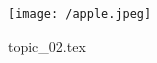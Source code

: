 \documentclass[a4paper,12pt, openany]{book}
\begin{document}
    \maketitle

    \texttt{[image: /apple.jpeg]}

    
    {topic_02.tex}
\end{document}
